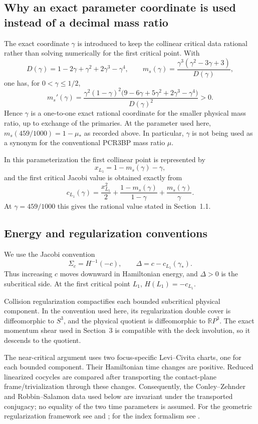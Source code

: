 \documentclass[11pt]{article}
\begin{document}
\subsection{Why an exact parameter coordinate is used instead of a decimal mass ratio}
The exact coordinate $\gamma$ is introduced to keep the collinear critical data rational rather than solving numerically for the first critical point. With
\[
D(\gamma)=1-2\gamma+\gamma^2+2\gamma^3-\gamma^4,
\qquad
m_s(\gamma)=\frac{\gamma^3(\gamma^2-3\gamma+3)}{D(\gamma)},
\]
one has, for $0<\gamma\le1/2$,
\[
m_s'(\gamma)
=
\frac{\gamma^2(1-\gamma)^2
\bigl(9-6\gamma+5\gamma^2+2\gamma^3-\gamma^4\bigr)}
{D(\gamma)^2}>0.
\]
Hence $\gamma$ is a one-to-one exact rational coordinate for the smaller physical mass ratio, up to exchange of the primaries. At the parameter used here, $m_s(459/1000)=1-\mu_*$ as recorded above. In particular, $\gamma$ is not being used as a synonym for the conventional PCR3BP mass ratio $\mu$.

In this parameterization the first collinear point is represented by
\[
x_{L_1}=1-m_s(\gamma)-\gamma,
\]
and the first critical Jacobi value is obtained exactly from
\[
c_{L_1}(\gamma)
=
\frac{x_{L_1}^2}{2}
+\frac{1-m_s(\gamma)}{1-\gamma}
+\frac{m_s(\gamma)}{\gamma}.
\]
At $\gamma=459/1000$ this gives the rational value stated in Section~1.1.

\subsection{Energy and regularization conventions}
We use the Jacobi convention
\[
\Sigma_c=H^{-1}(-c),
\qquad
\Delta=c-c_{L_1}(\gamma_*).
\]
Thus increasing $c$ moves downward in Hamiltonian energy, and $\Delta>0$ is the subcritical side. At the first critical point $L_1$, $H(L_1)=-c_{L_1}$.

Collision regularization compactifies each bounded subcritical physical component. In the convention used here, its regularization double cover is diffeomorphic to $S^3$, and the physical quotient is diffeomorphic to $\mathbb{R}P^3$. The exact momentum shear used in Section~3 is compatible with the deck involution, so it descends to the quotient.

The near-critical argument uses two focus-specific Levi--Civita charts, one for each bounded component. Their Hamiltonian time changes are positive. Reduced linearized cocycles are compared after transporting the contact-plane frame/trivialization through these changes. Consequently, the Conley--Zehnder and Robbin--Salamon data used below are invariant under the transported conjugacy; no equality of the two time parameters is assumed. For the geometric regularization framework see \citet{Moser1970} and \citet{FrauenfelderVanKoert2018}; for the index formalism see \citet{RobbinSalamon1993}.
\end{document}
